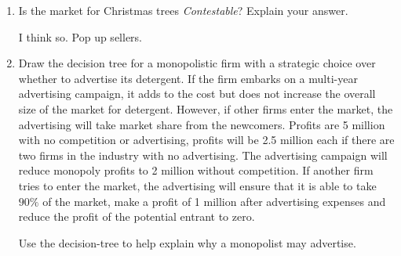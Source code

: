 \documentclass[12pt, a4paper, oneside]{article}\usepackage[]{graphicx}\usepackage[]{color}
\begin{document}
\begin{enumerate}
\item Is the market for Christmas trees \emph{Contestable}?  Explain your answer.

I think so.  Pop up sellers. 

\item Draw the decision tree for a monopolistic firm with a strategic choice over whether to advertise its detergent.  If the firm embarks on a multi-year advertising campaign, it adds to the cost but does not increase the overall size of the market for detergent.  However, if other firms enter the market, the advertising will take market share from the newcomers.  Profits are  5 million with no competition or advertising, profits will be  2.5 million each if there are two firms in the industry with no advertising.  The advertising campaign will reduce monopoly profits to 2 million without competition.  If another firm tries to enter the market, the advertising will ensure that it is able to take $90\%$ of the market, make a profit of  1 million after advertising expenses and reduce the profit of the potential entrant to zero.  

Use the decision-tree to help explain why a monopolist may advertise. 


  
  
\end{enumerate}
\end{document}
